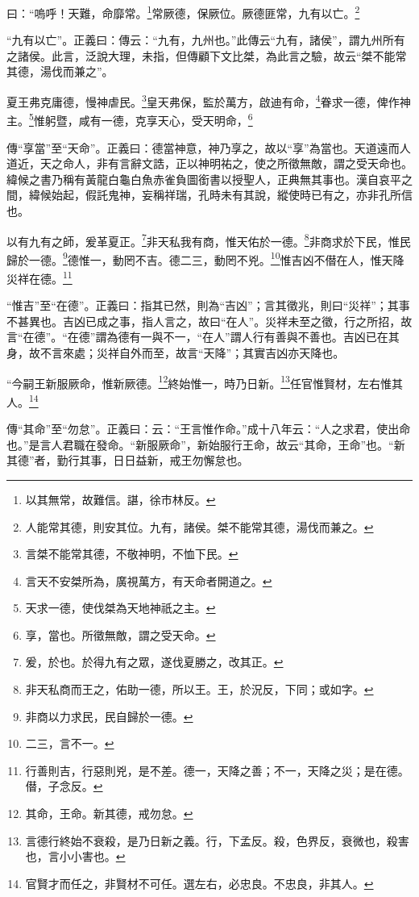 曰：“嗚呼！天難，命靡常。\footnote{以其無常，故難信。諶，徐巿林反。}常厥德，保厥位。厥德匪常，九有以亡。\footnote{人能常其德，則安其位。九有，諸侯。桀不能常其德，湯伐而兼之。}

{\noindent\shu{}\fzkt “九有以亡”。正義曰：傳云：“九有，九州也。”此傳云“九有，諸侯”，謂九州所有之諸侯。此言，泛說大理，未指，但傳顧下文比桀，為此言之驗，故云“桀不能常其德，湯伐而兼之”。 \par}

夏王弗克庸德，慢神虐民。\footnote{言桀不能常其德，不敬神明，不恤下民。}皇天弗保，監於萬方，啟迪有命，\footnote{言天不安桀所為，廣視萬方，有天命者開道之。}眷求一德，俾作神主。\footnote{天求一德，使伐桀為天地神祇之主。}惟躬暨，咸有一德，克享天心，受天明命，\footnote{享，當也。所徵無敵，謂之受天命。}

{\noindent\zhuan{}\fzbyks 傳“享當”至“天命”。正義曰：德當神意，神乃享之，故以“享”為當也。天道遠而人道近，天之命人，非有言辭文誥，正以神明祐之，使之所徵無敵，謂之受天命也。緯候之書乃稱有黃龍白龜白魚赤雀負圖銜書以授聖人，正典無其事也。漢自哀平之間，緯候始起，假託鬼神，妄稱祥瑞，孔時未有其說，縱使時已有之，亦非孔所信也。 \par}

以有九有之師，爰革夏正。\footnote{爰，於也。於得九有之眾，遂伐夏勝之，改其正。}非天私我有商，惟天佑於一德。\footnote{非天私商而王之，佑助一德，所以王。王，於況反，下同；或如字。}非商求於下民，惟民歸於一德。\footnote{非商以力求民，民自歸於一德。}德惟一，動罔不吉。德二三，動罔不兇。\footnote{二三，言不一。}惟吉凶不僣在人，惟天降災祥在德。\footnote{行善則吉，行惡則兇，是不差。德一，天降之善；不一，天降之災；是在德。僣，子念反。}

{\noindent\shu{}\fzkt “惟吉”至“在德”。正義曰：指其已然，則為“吉凶”；言其徵兆，則曰“災祥”；其事不甚異也。吉凶已成之事，指人言之，故曰“在人”。災祥未至之徵，行之所招，故言“在德”。“在德”謂為德有一與不一，“在人”謂人行有善與不善也。吉凶已在其身，故不言來處；災祥自外而至，故言“天降”；其實吉凶亦天降也。 \par}

“今嗣王新服厥命，惟新厥德。\footnote{其命，王命。新其德，戒勿怠。}終始惟一，時乃日新。\footnote{言德行終始不衰殺，是乃日新之義。行，下孟反。殺，色界反，衰微也，殺害也，言小小害也。}任官惟賢材，左右惟其人。\footnote{官賢才而任之，非賢材不可任。選左右，必忠良。不忠良，非其人。}


{\noindent\zhuan{}\fzbyks 傳“其命”至“勿怠”。正義曰：云：“王言惟作命。”成十八年云：“人之求君，使出命也。”是言人君職在發命。“新服厥命”，新始服行王命，故云“其命，王命”也。“新其德”者，勤行其事，日日益新，戒王勿懈怠也。 \par}

